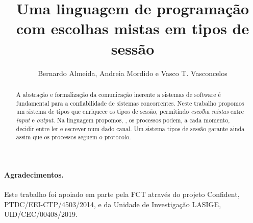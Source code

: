 \documentclass[runningheads]{llncs}
\title{Uma linguagem de programação com escolhas mistas em tipos de sessão}
\author{Bernardo Almeida, Andreia Mordido e Vasco T. Vasconcelos}
\institute{LASIGE, Faculdade de Ciências, Universidade de Lisboa, Portugal}
\begin{document}
\maketitle

\begin{abstract}
  A abstração e formalização da comunicação inerente a sistemas de
  software é fundamental para a confiabilidade de sistemas
  concorrentes.  Neste trabalho propomos um sistema de tipos que
  enriquece os tipos de sessão, permitindo \emph{escolha mistas} entre
  \textit{input} e \textit{output}.
  Na linguagem propomos, \mixedchoice, os processos podem, a cada
  momento, decidir entre ler e escrever num dado canal.
  Um sistema tipos de sessão garante ainda assim que os processos
  seguem o protocolo.

\end{abstract}






\paragraph{Agradecimentos.}

Este trabalho foi apoiado em parte pela FCT através do projeto
Confident, PTDC/EEI-CTP/4503/2014, e da Unidade de Investigação LASIGE,
UID/CEC/00408/2019.



\end{document}
